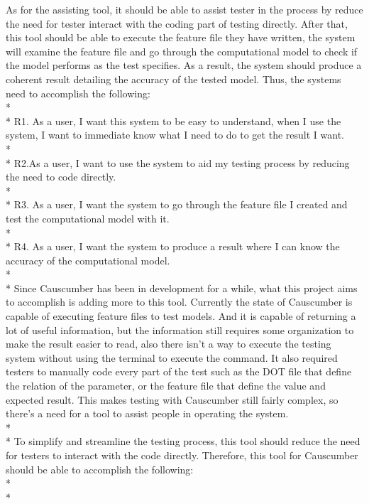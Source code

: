 As for the assisting tool, it should be able to assist tester in the process by reduce the need for tester interact with the coding part of testing directly. After that, this tool should be able to execute the feature file they have written, the system will examine the feature file and go through the computational model to check if the model performs as the test specifies. As a result, the system should produce a coherent result detailing the accuracy of the tested model. Thus, the systems need to accomplish the following:\\*
\\*
R1. As a user, I want this system to be easy to understand, when I use the system, I want to immediate know what I need to do to get the result I want.\\*
\\*
R2.As a user, I want to use the system to aid my testing process by reducing the need to code directly. \\*
\\*
R3. As a user, I want the system to go through the feature file I created and test the computational model with it.\\*
\\*
R4. As a user, I want the system to produce a result where I can know the accuracy of the computational model.\\*
\\*
Since Causcumber has been in development for a while, what this project aims to accomplish is adding more to this tool. Currently the state of Causcumber is capable of executing feature files to test models. And it is capable of returning a lot of useful information, but the information still requires some organization to make the result easier to read, also there isn’t a way to execute the testing system without using the terminal to execute the command. It also required testers to manually code every part of the test such as the DOT file that define the relation of the parameter, or the feature file that define the value and expected result. This makes testing with Causcumber still fairly complex, so there’s a need for a tool to assist people in operating the system. \\*\\*
To simplify and streamline the testing process, this tool should reduce the need for testers to interact with the code directly. Therefore, this tool for Causcumber should be able to accomplish the following:\\*
\\*
